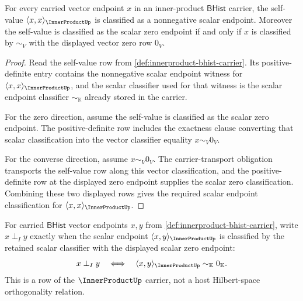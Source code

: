 \begin{theorem}
\label{thm:innerproduct-positive-definite-obligation}
For every carried vector endpoint $x$ in an inner-product $\mathsf{BHist}$
carrier, the self-value $\langle x,x\rangle_{\InnerProductUp}$ is classified
as a nonnegative scalar endpoint. Moreover the self-value is classified as the
scalar zero endpoint if and only if $x$ is classified by $\sim_V$ with the
displayed vector zero row $0_V$.
\end{theorem}
\begin{proof}
Read the self-value row from
\autoref{def:innerproduct-bhist-carrier}. Its positive-definite entry
contains the nonnegative scalar endpoint witness for
$\langle x,x\rangle_{\InnerProductUp}$, and the scalar classifier used for
that witness is the scalar endpoint classifier $\sim_{\mathbb{K}}$ already
stored in the carrier.

For the zero direction, assume the self-value is classified as the scalar zero
endpoint. The positive-definite row includes the exactness clause converting
that scalar classification into the vector classifier equality $x\sim_V 0_V$.

For the converse direction, assume $x\sim_V 0_V$. The carrier-transport
obligation transports the self-value row along this vector classification,
and the positive-definite row at the displayed zero endpoint supplies the
scalar zero classification. Combining these two displayed rows gives the
required scalar endpoint classification for $\langle x,x\rangle_{\InnerProductUp}$.
\end{proof}

\begin{definition}
\label{def:innerproduct-orthogonality-row}
For carried $\mathsf{BHist}$ vector endpoints $x,y$ from
\autoref{def:innerproduct-bhist-carrier}, write $x\perp_I y$ exactly when
the scalar endpoint $\langle x,y\rangle_{\InnerProductUp}$ is classified by
the retained scalar classifier with the displayed scalar zero endpoint:
$$
x\perp_I y
\quad\Longleftrightarrow\quad
\langle x,y\rangle_{\InnerProductUp}\sim_{\mathbb{K}}0_{\mathbb{K}}.
$$
This is a row of the $\InnerProductUp$ carrier, not a host Hilbert-space
orthogonality relation.
\end{definition}

